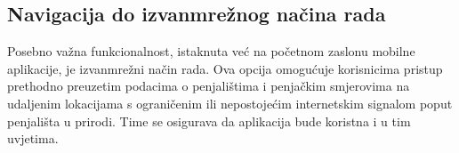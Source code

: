 \subsection{Navigacija do izvanmrežnog načina rada}


Posebno važna funkcionalnost, istaknuta već na početnom zaslonu mobilne aplikacije, je izvanmrežni način rada. Ova opcija omogućuje korisnicima pristup prethodno preuzetim podacima o penjalištima i penjačkim smjerovima na udaljenim lokacijama s ograničenim ili nepostojećim internetskim signalom poput penjališta u prirodi. Time se osigurava da aplikacija bude koristna i u tim uvjetima.


